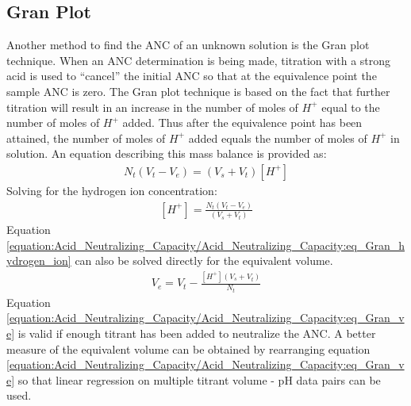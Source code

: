 \documentclass[letterpaper,10pt,english]{sphinxmanual}
\begin{document}
\subsection{Gran Plot}
\label{\detokenize{Acid_Neutralizing_Capacity/Acid_Neutralizing_Capacity:gran-plot}}\label{\detokenize{Acid_Neutralizing_Capacity/Acid_Neutralizing_Capacity:heading-anc-gran-plot}}
Another method to find the ANC of an unknown solution is the Gran plot technique. When an ANC determination is being made, titration with a strong acid is used to “cancel” the initial ANC so that at the equivalence point the sample ANC is zero. The Gran plot technique is based on the fact that further titration will result in an increase in the number of moles of \(H^+\) equal to the number of moles of \(H^+\) added. Thus after the equivalence point has been attained, the number of moles of \(H^+\) added equals the number of moles of \(H^+\) in solution. An equation describing this mass balance is provided as:
\begin{equation}\label{equation:Acid_Neutralizing_Capacity/Acid_Neutralizing_Capacity:eq_Gran_H_balance}
\begin{split}N_{t} \left(V_{t} -V_{e} \right)=\left(V_{s} +V_{t} \right)\left[H^{+} \right]\end{split}
\end{equation}
Solving for the hydrogen ion concentration:
\begin{equation}\label{equation:Acid_Neutralizing_Capacity/Acid_Neutralizing_Capacity:eq_Gran_hydrogen_ion}
\begin{split}\left[H^{+} \right]=\frac{N_{t} \left(V_{t} -V_{e} \right)}{\left(V_{s} +V_{t} \right)}\end{split}
\end{equation}
Equation \eqref{equation:Acid_Neutralizing_Capacity/Acid_Neutralizing_Capacity:eq_Gran_hydrogen_ion} can also be solved directly for the equivalent volume.
\begin{equation}\label{equation:Acid_Neutralizing_Capacity/Acid_Neutralizing_Capacity:eq_Gran_ve}
\begin{split}V_{e} =V_{t} -\frac{\left[H^{+} \right]\left(V_{s} +V_{t} \right)}{N_{t} }\end{split}
\end{equation}
Equation \eqref{equation:Acid_Neutralizing_Capacity/Acid_Neutralizing_Capacity:eq_Gran_ve} is valid if enough titrant has been added to neutralize the ANC. A better measure of the equivalent volume can be obtained by rearranging equation \eqref{equation:Acid_Neutralizing_Capacity/Acid_Neutralizing_Capacity:eq_Gran_ve} so that linear regression on multiple titrant volume - pH data pairs can be used.
\end{document}
